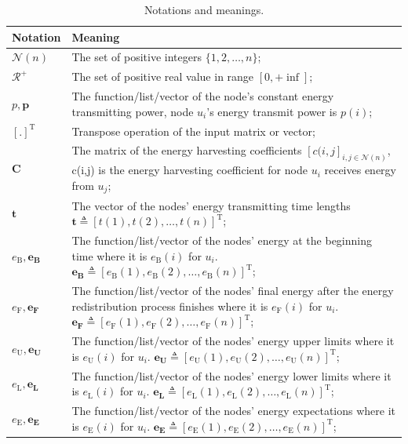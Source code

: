 \documentclass[journal,10pt]{IEEEtran}
\begin{document}
\begin{table}[!htbp]
\centering
\caption{Notations and meanings.}
\label{T1}
\footnotesize{
\begin{tabular}
{|p{}|p{}|}
\hline
\hline
\textbf{Notation} & Meaning\\
\hline
\hline
$\mathcal{N}(n)$ & The set of positive integers $\{1,2,\ldots,n\}$;\\
\hline
$\mathcal{R^{+}}$ & The set of positive real value in range $[0,{+}\inf]$;\\
\hline
$p, \mathbf{p}$ & The function/list/vector of the node's constant energy transmitting power, node $u_i$'s energy transmit power is $p(i)$;\\
\hline
$[.]^{\text{T}}$ & Transpose operation of the input matrix or vector;\\
\hline
$\mathbf{C}$ & The matrix of the energy harvesting coefficients $[c(i,j]_{i,j{\in}\mathcal{N}(n)}$, c(i,j) is the energy harvesting coefficient for node $u_i$ receives energy from $u_j$;\\
\hline
$\mathbf{t}$ & The vector of the nodes' energy transmitting time lengths $\mathbf{t}{\triangleq}[t(1),t(2),\ldots,t(n)]^{\text{T}}$;\\
\hline
$e_\text{B}, \mathbf{e_\text{B}}$ & The function/list/vector of the nodes' energy at the beginning time where it is $e_\text{B}(i)$ for $u_i$.  $\mathbf{e_\text{B}}{\triangleq}[e_\text{B}(1),e_\text{B}(2),\ldots,e_\text{B}(n)]^{\text{T}}$;\\
\hline
$e_\text{F}, \mathbf{e_\text{F}}$ & The function/list/vector of the nodes' final energy after the energy redistribution process finishes where it is $e_\text{F}(i)$ for $u_i$. $\mathbf{e_\text{F}}{\triangleq}[e_\text{F}(1),e_\text{F}(2),\ldots,e_\text{F}(n)]^{\text{T}}$;\\
\hline
$e_\text{U}, \mathbf{e_\text{U}}$ & The function/list/vector of the nodes' energy upper limits where it is $e_\text{U}(i)$ for $u_i$. $\mathbf{e_\text{U}}{\triangleq}[e_\text{U}(1),e_\text{U}(2),\ldots,e_\text{U}(n)]^{\text{T}}$;\\
\hline
$e_\text{L}, \mathbf{e_\text{L}}$ & The function/list/vector of the nodes' energy lower limits where it is $e_\text{L}(i)$ for $u_i$. $\mathbf{e_\text{L}}{\triangleq}[e_\text{L}(1),e_\text{L}(2),\ldots,e_\text{L}(n)]^{\text{T}}$;\\
\hline
$e_\text{E}, \mathbf{e_\text{E}}$ & The function/list/vector of the nodes' energy expectations where it is $e_\text{E}(i)$ for $u_i$. $\mathbf{e_\text{E}}{\triangleq}[e_\text{E}(1),e_\text{E}(2),\ldots,e_\text{E}(n)]^{\text{T}}$;\\

\end{tabular}}
\end{table}
\end{document}
